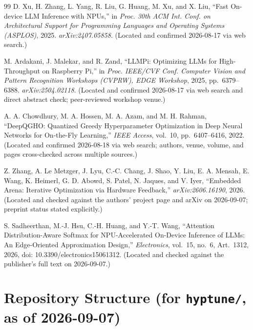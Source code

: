 \documentclass[journal]{IEEEtran}
\begin{document}
\begin{thebibliography}{99}
 D. Xu, H. Zhang, L. Yang, R. Liu, G. Huang, M. Xu, and X. Liu, ``Fast On-device LLM Inference with NPUs,'' in \emph{Proc. 30th ACM Int. Conf. on Architectural Support for Programming Languages and Operating Systems (ASPLOS)}, 2025. \emph{arXiv:2407.05858}. (Located and confirmed 2026-08-17 via web search.)

 M. Ardakani, J. Malekar, and R. Zand, ``LLMPi: Optimizing LLMs for High-Throughput on Raspberry Pi,'' in \emph{Proc. IEEE/CVF Conf. Computer Vision and Pattern Recognition Workshops (CVPRW), EDGE Workshop}, 2025, pp.~6379--6388. \emph{arXiv:2504.02118}. (Located and confirmed 2026-08-17 via web search and direct abstract check; peer-reviewed workshop venue.)

 A. A. Chowdhury, M. A. Hossen, M. A. Azam, and M. H. Rahman, ``DeepQGHO: Quantized Greedy Hyperparameter Optimization in Deep Neural Networks for On-the-Fly Learning,'' \emph{IEEE Access}, vol.~10, pp.~6407--6416, 2022. (Located and confirmed 2026-08-18 via web search; authors, venue, volume, and pages cross-checked across multiple sources.)

 Z. Zhang, A. Le Metzger, J. Lyu, C.-C. Chang, J. Shao, Y. Liu, E. A. Mensah, E. Wang, K. Heimerl, G. D. Abowd, S. Patel, N. Jaques, and V. Iyer, ``Embedded Arena: Iterative Optimization via Hardware Feedback,'' \emph{arXiv:2606.16190}, 2026. (Located and checked against the authors' project page and arXiv on 2026-09-07; preprint status stated explicitly.)

 S. Sadheerthan, M.-J. Hsu, C.-H. Huang, and Y.-T. Wang, ``Attention Distribution-Aware Softmax for NPU-Accelerated On-Device Inference of LLMs: An Edge-Oriented Approximation Design,'' \emph{Electronics}, vol.~15, no.~6, Art.~1312, 2026, doi: 10.3390/electronics15061312. (Located and checked against the publisher's full text on 2026-09-07.)

\end{thebibliography}

\appendices

\section{Repository Structure (for \texttt{hyptune/}, as of 2026-09-07)}
\end{document}
